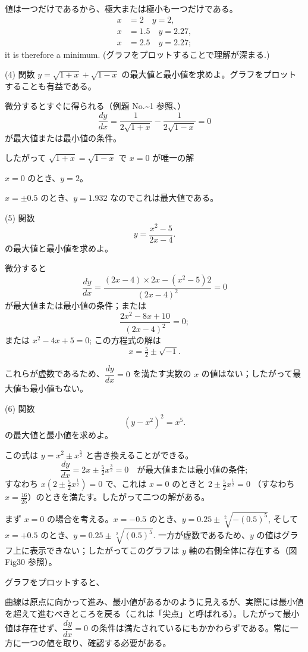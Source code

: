 \documentclass[a4paper,11pt,openany]{ltjsbook}
\begin{document}
値は一つだけであるから、極大または極小も一つだけである。
\begin{align*}
x &= 2 \quad y = 2, \\
x &= 1.5 \quad y = 2.27,   \\
x &= 2.5 \quad y = 2.27;
\end{align*}
it is therefore a minimum. (グラフをプロットすることで理解が深まる.)

(4) 関数 $y = \sqrt{1+x} + \sqrt{1-x}$ の最大値と最小値を求めよ。グラフをプロットすることも有益である。

微分するとすぐに得られる（例題 No.\textasciitilde{}1 参照、\pageref{ExNo1}）
\[
\dfrac{dy}{dx} = \dfrac{1}{2\sqrt{1+x}} - \dfrac{1}{2\sqrt{1-x}} = 0
\]
が最大値または最小値の条件。

したがって $\sqrt{1+x} = \sqrt{1-x}$ で $x = 0$ が唯一の解

$x=0$ のとき、$y=2$。

$x=\pm0.5$ のとき、$y=1.932$ なのでこれは最大値である。

(5) 関数
\[
y = \dfrac{x^2-5}{2x-4}.
\]
の最大値と最小値を求めよ。

微分すると
\[
\dfrac{dy}{dx} = \dfrac{(2x-4) \times  2x - (x^2-5)2}{(2x-4)^2} = 0
\]
が最大値または最小値の条件；または
\[
\dfrac{2x^2 - 8x + 10}{(2x - 4)^2} = 0;
\]
または $x^2 - 4x + 5 = 0$; この方程式の解は
\[
x = \tfrac{5}{2} ± \sqrt{-1}.
\]

これらが虚数であるため、$\dfrac{dy}{dx} = 0$ を満たす実数の $x$ の値はない；したがって最大値も最小値もない。

(6) 関数
\[
(y-x^2)^2 = x^5.
\]
の最大値と最小値を求めよ。

この式は $y = x^2 ± x^{\frac{5}{2}}$ と書き換えることができる。
\[
\dfrac{dy}{dx} = 2x ± \tfrac{5}{2} x^{\frac{3}{2}} = 0 \quad\text{が最大値または最小値の条件};
\]
すなわち $x(2 ± \tfrac{5}{2} x^{\frac{1}{2}}) = 0$ で、これは $x = 0$ のときと $2 ± \tfrac{5}{2} x^{\frac{1}{2}} = 0$ （すなわち $x=\tfrac{16}{25}$）のときを満たす。したがって二つの解がある。

まず $x = 0$ の場合を考える。$x = -0.5$ のとき、$y = 0.25 ± \sqrt[2]{-(0.5)^5}$, そして $x = +0.5$ のとき、$y = 0.25 ± \sqrt[2]{(0.5)^5}$. 一方が虚数であるため、$y$ の値はグラフ上に表示できない；したがってこのグラフは $y$ 軸の右側全体に存在する（図 Fig{30} 参照）。

グラフをプロットすると、

曲線は原点に向かって進み、最小値があるかのように見えるが、実際には最小値を超えて進むべきところを戻る（これは「尖点」と呼ばれる）。したがって最小値は存在せず、$\dfrac{dy}{dx} = 0$ の条件は満たされているにもかかわらずである。常に一方に一つの値を取り、確認する必要がある。
\end{document}

